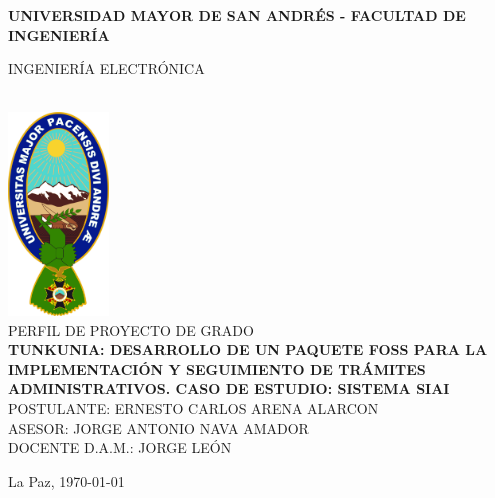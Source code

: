 \begin{titlepage}
	\centering
	{\bfseries \large UNIVERSIDAD MAYOR DE SAN ANDRÉS - FACULTAD DE INGENIERÍA\par INGENIERÍA ELECTRÓNICA }\\[2cm]

	\includegraphics[width=0.2\textwidth]{assets/umsa.png}
	\\[1cm]

	{\LARGE \MakeUppercase{Perfil de Proyecto de Grado}}\\[1cm]

	\textbf{\Large \MakeUppercase{TUNKUNIA: Desarrollo de un paquete FOSS para la implementación y seguimiento de trámites administrativos. Caso de estudio: Sistema SIAI}}
	\vfill
	\MakeUppercase{Postulante: } \MakeUppercase{Ernesto Carlos Arena Alarcon}\\[1cm]

	\MakeUppercase{Asesor: } \MakeUppercase{Jorge Antonio Nava Amador}\\[1cm]

	\MakeUppercase{Docente D.A.M.: } \MakeUppercase{Jorge León}\\[1cm]

	\vfill
	{La Paz, \today\par}
\end{titlepage}